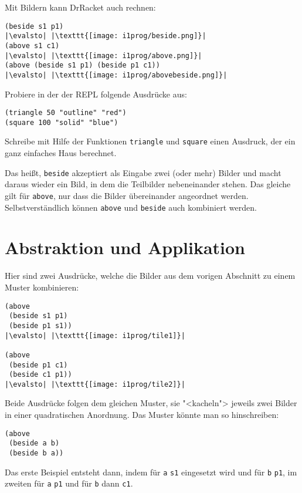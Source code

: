 %
Mit Bildern kann DrRacket auch rechnen:\label{function:beside-above}
%
\begin{lstlisting}
(beside s1 p1)
|\evalsto| |\texttt{[image: i1prog/beside.png]}|
(above s1 c1)
|\evalsto| |\texttt{[image: i1prog/above.png]}|
(above (beside s1 p1) (beside p1 c1))
|\evalsto| |\texttt{[image: i1prog/abovebeside.png]}|
\end{lstlisting}
%
\begin{aufgabeinline}
  Probiere in der der REPL folgende Ausdrücke aus:
\begin{lstlisting}
(triangle 50 "outline" "red")
(square 100 "solid" "blue")
\end{lstlisting}
  Schreibe mit Hilfe der Funktionen \lstinline{triangle} und
  \lstinline{square} einen Ausdruck, der ein ganz einfaches Haus
  berechnet.
\end{aufgabeinline}
%
Das heißt, \lstinline{beside} akzeptiert als Eingabe zwei (oder mehr)
Bilder und macht daraus wieder ein Bild, in dem die Teilbilder
nebeneinander stehen.  Das gleiche gilt für \lstinline{above}, nur dass
die Bilder übereinander angeordnet werden.  Selbstverständlich können
\lstinline{above} und \lstinline{beside} auch kombiniert werden.

\section{Abstraktion und Applikation}
\label{sec:abstraktion-und-applikation}

Hier sind zwei Ausdrücke, welche die Bilder aus dem vorigen Abschnitt
zu einem Muster kombinieren:
%
\begin{lstlisting}
(above
 (beside s1 p1)
 (beside p1 s1))
|\evalsto| |\texttt{[image: i1prog/tile1]}|

(above
 (beside p1 c1)
 (beside c1 p1))
|\evalsto| |\texttt{[image: i1prog/tile2]}|
\end{lstlisting}
%
Beide Ausdrücke folgen dem gleichen Muster, sie "<kacheln"> jeweils zwei
Bilder in einer quadratischen Anordnung.  Das Muster könnte man so
hinschreiben:
%
\begin{lstlisting}
(above
 (beside a b)
 (beside b a))
\end{lstlisting}
%
Das erste Beispiel entsteht dann, indem für \lstinline{a} \lstinline{s1}
eingesetzt wird und für \lstinline{b} \lstinline{p1}, im zweiten für \lstinline{a}
\lstinline{p1} und für \lstinline{b} dann \lstinline{c1}.

